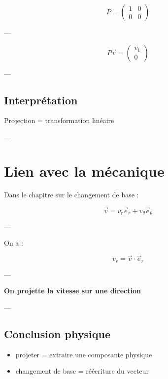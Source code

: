 \documentclass[11pt,a4paper]{article}
\begin{document}
\[
\boxed{
P =
\begin{pmatrix}
1 & 0 \\
0 & 0
\end{pmatrix}
}
\]

---

\[
P \vec{v} =
\begin{pmatrix}
v_1 \\
0
\end{pmatrix}
\]

---

\subsection{Interprétation}

\begin{center}
Projection = transformation linéaire
\end{center}

---

\section{Lien avec la mécanique}

Dans le chapitre sur le changement de base :

\[
\vec{v} = v_r \vec{e}_r + v_\theta \vec{e}_\theta
\]

---

On a :

\[
v_r = \vec{v} \cdot \vec{e}_r
\]

---

\begin{center}
\textbf{On projette la vitesse sur une direction}
\end{center}

---

\subsection{Conclusion physique}

\begin{itemize}
\item projeter = extraire une composante physique
\item changement de base = réécriture du vecteur
\end{itemize}
\end{document}
